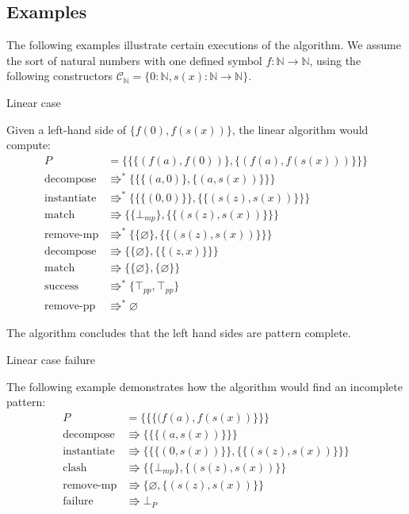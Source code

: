 \subsection{Examples} \label{examples-alg}

The following examples illustrate certain executions of the algorithm. We assume the sort of natural numbers with one defined symbol $f : \mathbb{N} \rightarrow \mathbb{N}$, using the following constructors $\mathcal{C}_{\mathbb{N}} = \{0 : \mathbb{N}, s(x) : \mathbb{N} \rightarrow \mathbb{N}\}$.

\begin{example} Linear case \label{ex-thiemann-lin}

Given a left-hand side of $\{f(0), f(s(x))\}$, the linear algorithm would compute:
\begin{align*}
    P &= \{\{\{(f(a), f(0))\}, \{(f(a), f(s(x)))\}\}\}\\
\text{decompose} &\Rrightarrow^{*} \{\{\{(a, 0)\}, \{(a, s(x))\}\}\} \\
\text{instantiate} &\Rrightarrow^{*} \{\{\{(0, 0)\}\}, \{\{(s(z), s(x))\}\}\} \\
\text{match} &\Rrightarrow \{\{\bot_{mp}\}, \{\{(s(z), s(x))\}\}\} \\
\text{remove-mp} &\Rrightarrow^{*} \{\{\varnothing\}, \{\{(s(z), s(x))\}\}\} \\
\text{decompose} &\Rrightarrow \{\{\varnothing\}, \{\{(z, x)\}\}\} \\
\text{match} &\Rrightarrow \{\{\varnothing\}, \{\varnothing\}\} \\
\text{success} &\Rrightarrow^{*} \{\top_{pp}, \top_{pp}\} \\
\text{remove-pp} &\Rrightarrow^{*} \varnothing
\end{align*}
\end{example}

The algorithm concludes that the left hand sides are pattern complete.

\newpage
\begin{example} Linear case failure \label{ex-thiemann-lin-fail}

The following example demonstrates how the algorithm would find an incomplete pattern:
\begin{align*}
    P &= \{\{\{(f(a), f(s(x))\}\}\}\\
\text{decompose} &\Rrightarrow \{\{\{(a, s(x))\}\}\} \\
\text{instantiate} &\Rrightarrow \{\{\{(0, s(x))\}\}, \{\{(s(z), s(x))\}\}\} \\
\text{clash} &\Rrightarrow \{\{\bot_{mp}\}, \{(s(z), s(x))\}\} \\
\text{remove-mp} &\Rrightarrow \{\varnothing, \{(s(z), s(x))\}\} \\
\text{failure} &\Rrightarrow \bot_{P}
\end{align*}
\end{example}

